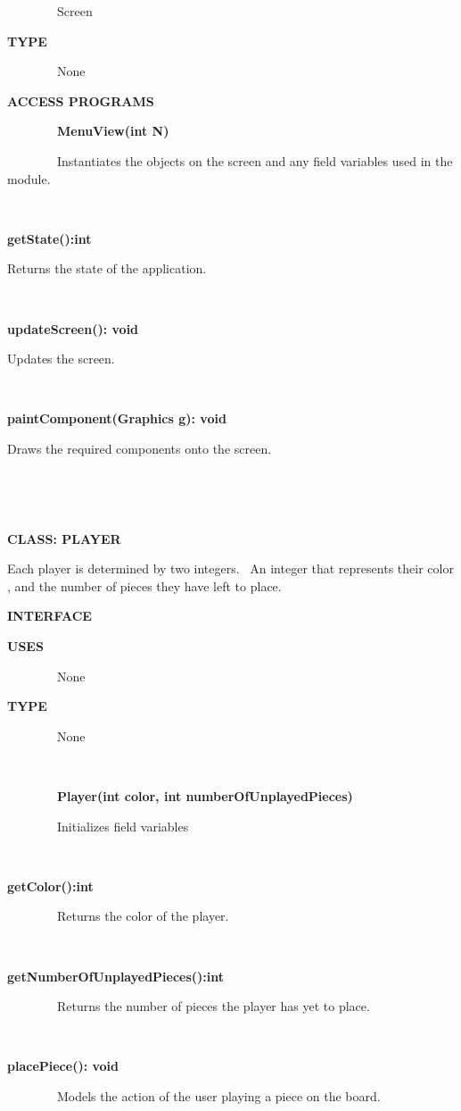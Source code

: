 \documentclass{article}
\begin{document}
{{~~~~~~~~Screen}

{\textbf{TYPE}}

{~~~~~~~~None}

{\textbf{ACCESS PROGRAMS}}

{~~~~~~~~\textbf{MenuView(int N)}}

{~~~~~~~~Instantiates the objects on the screen and any field variables
used in the module.}

{~~~~~~~~~~~~~~~~}

{\textbf{getState():int}}

{Returns the state of the application.}

{~~~~~~~~}

{\textbf{updateScreen(): void}}

{Updates the screen.}

{~~~~~~~~}

{\textbf{paintComponent(Graphics g): void}}

{Draws the required components onto the screen.}

{~~~~~~~~~~~~~~~~}

{~~~~~~~~}

{\textbf{CLASS: PLAYER}}

{Each player is determined by two integers. ~An integer that represents
their color , and the number of pieces they have left to place.}

{}

{\textbf{INTERFACE}}

{\textbf{USES}}

{~~~~~~~~None}

{\textbf{TYPE}}

{~~~~~~~~None}

{~~~~~~~~~~~~~~~~}

{~~~~~~~~\textbf{Player(int color, int numberOfUnplayedPieces)}}

{~~~~~~~~Initializes field variables}

{~~~~~~~~}

{\textbf{getColor():int}}

{~~~~~~~~Returns the color of the player.}

{~~~~~~~~~~~~~~~~}

{\textbf{getNumberOfUnplayedPieces():int}}

{~~~~~~~~Returns the number of pieces the player has yet to place.}

{~}

{\textbf{placePiece(): void}}

{~~~~~~~~Models the action of the user playing a piece on the board.}

}
\end{document}
